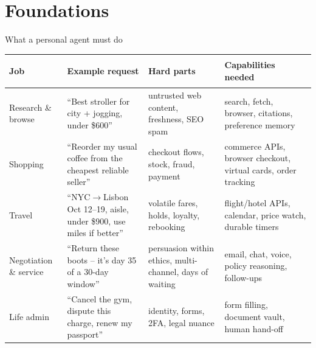 \documentclass[aspectratio=169,10pt]{beamer}
\begin{document}
\section{Foundations}
\begin{frame}{What a personal agent must do}
\scriptsize
\renewcommand{\arraystretch}{1.35}
\begin{tabularx}{\linewidth}{>{\bfseries\raggedright\arraybackslash}p{2.2cm} X X X}
\toprule
Job & Example request & Hard parts & Capabilities needed\\
\midrule
Research \& browse & ``Best stroller for city + jogging, under \$600'' & untrusted web content, freshness, SEO spam & search, fetch, browser, citations, preference memory\\
Shopping & ``Reorder my usual coffee from the cheapest reliable seller'' & checkout flows, stock, fraud, payment & commerce APIs, browser checkout, virtual cards, order tracking\\
Travel & ``NYC$\rightarrow$Lisbon Oct 12--19, aisle, under \$900, use miles if better'' & volatile fares, holds, loyalty, rebooking & flight/hotel APIs, calendar, price watch, durable timers\\
Negotiation \& service & ``Return these boots -- it's day 35 of a 30-day window'' & persuasion within ethics, multi-channel, days of waiting & email, chat, voice, policy reasoning, follow-ups\\
Life admin & ``Cancel the gym, dispute this charge, renew my passport'' & identity, forms, 2FA, legal nuance & form filling, document vault, human hand-off\\
\bottomrule
\end{tabularx}
\end{frame}
\end{document}
